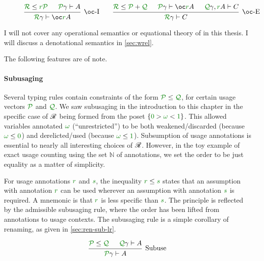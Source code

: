 \begin{figure}
\begin{displaymath}
\begin{matrix}
\begin{prooftree}
        \hypo{\grR \le \gr r\grP}
        \hypo{\grP\gamma \vdash A}
        \infer2[$\oc$-I]{\grR\gamma \vdash \oc\gr rA}
      \end{prooftree}
      &&
      \begin{prooftree}
        \hypo{\grR \le \grP + \grQ}
        \hypo{\grP\gamma \vdash \oc\gr rA}
        \hypo{\grQ\gamma, \gr rA \vdash C}
        \infer3[$\oc$-E]{\grR\gamma \vdash C}
      \end{prooftree}
    \end{matrix}
  \end{displaymath}
  \caption{\name{}}
  \label{fig:lr}
\end{figure}

I will not cover any operational semantics or equational theory of \name{} in
this thesis.
I will discuss a denotational semantics in \cref{sec:wrel}.

The following features are of note.

\paragraph{Subusaging}
Several typing rules contain constraints of the form $\grP \leq \grQ$, for
certain usage vectors $\grP$ and $\grQ$.
We saw subusaging in the introduction to this chapter in the specific case of
$\mathscr R$ being formed from the poset $\{\gr0 > \gr\omega < \gr1\}$.
This allowed variables annotated $\gr\omega$ (``unrestricted'') to be both
weakened/discarded (because $\gr\omega \leq \gr0$) and derelicted/used
(because $\gr\omega \leq \gr1$).
Subsumption of usage annotations is essential to nearly all interesting choices
of $\mathscr R$.
However, in the toy example of exact usage counting using the set $\mathbb N$ of
annotations, we set the order to be just equality as a matter of simplicity.

For usage annotations $\gr r$ and $\gr s$, the inequality $\gr r \leq \gr s$
states that an assumption with annotation $\gr r$ can be used wherever an
assumption with annotation $\gr s$ is required.
A mnemonic is that $\gr r$ is less specific than $\gr s$.
The principle is reflected by the admissible subusaging rule, where the order
has been lifted from annotations to usage contexts.
The subusaging rule is a simple corollary of renaming, as given in
\cref{sec:ren-sub-lr}.

\[
  \begin{prooftree}
    \hypo{\grP \leq \grQ}
    \hypo{\grQ\gamma \vdash A}
    \infer2[Subuse]{\grP\gamma \vdash A}
  \end{prooftree}
\]


